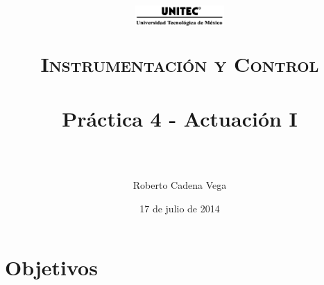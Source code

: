 



\title{	
	\normalfont \normalsize
	\begin{figure}[h]
		\begin{center}
			\includegraphics[width=0.3\textwidth]{../images/UNITEC.png} %
		\end{center}
	\end{figure}
	\textsc{Instrumentación y Control} \\ [25pt]
	\horrule{0.5pt} \\[0.4cm] %
	\huge Práctica 4 - Actuación I \\ %
	\horrule{2pt} \\[0.5cm] %
}

\author{Roberto Cadena Vega} %

\date{\normalsize 17 de julio de 2014} %




\maketitle %


\section{Objetivos}


